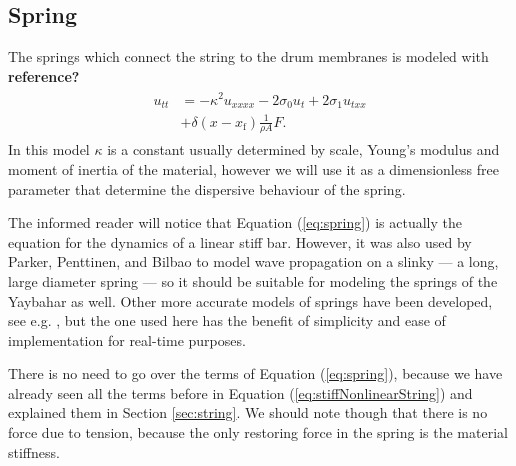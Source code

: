 \documentclass{article}
\begin{document}

\subsection{Spring}
\label{sec:spring}

The springs which connect the string to the drum membranes is modeled with \textbf{reference?}
\begin{align}
  \begin{split}
  u_{tt} &= -\kappa^2 u_{xxxx}- 2 \sigma_0 u_t + 2 \sigma_1 u_{txx} \\
  & + \delta(x-x_\text{f})\frac{1}{\rho A} F.
  \end{split}
  \label{eq:spring}
\end{align}
In this model $\kappa$ is a constant usually determined by scale, Young's modulus and moment of inertia of the material, however we will use it as a dimensionless free parameter that determine the dispersive behaviour of the spring\cite{bilbao_modular_2009}\cite{parker_modeling_2010}.

The informed reader will notice that Equation (\ref{eq:spring}) is actually the equation for the dynamics of a linear stiff bar\cite{bilbao_modular_2009}\cite[Chapter~7]{bilbao_numerical_2009}.
However, it was also used by Parker, Penttinen, and Bilbao to model wave propagation on a slinky --- a long, large diameter spring --- so it should be suitable for modeling the springs of the Yaybahar as well\cite{parker_modeling_2010}.
Other more accurate models of springs have been developed, see e.g. \cite{parker_spring_2009}, but the one used here has the benefit of simplicity and ease of implementation for real-time purposes.

There is no need to go over the terms of Equation (\ref{eq:spring}), because we have already seen all the terms before in Equation (\ref{eq:stiffNonlinearString}) and explained them in Section \ref{sec:string}.
We should note though that there is no force due to tension, because the only restoring force in the spring is the material stiffness.
\end{document}
